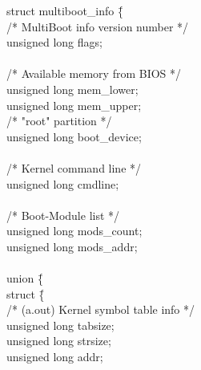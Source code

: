 \documentclass[a4paper]{report}
\begin{document}
\begin{figure}
\begin{tt}
\begin{tabbing}
struct multiboot\_info \= \{                                            \\
/* MultiBoot info version number */                                     \\
\>      unsigned long flags;                                            \\
									\\
/* Available memory from BIOS */                                        \\
\>      unsigned long mem\_lower;                                       \\
\>      unsigned long mem\_upper;                                       \\
/* "root" partition */                                                  \\
\>      unsigned long boot\_device;                                     \\
									\\
/* Kernel command line */                                               \\
\>      unsigned long cmdline;                                          \\
									\\
/* Boot-Module list */                                                  \\
\>      unsigned long mods\_count;                                      \\
\>      unsigned long mods\_addr;                                       \\
									\\
\>      union \= \{                                                     \\
\>      \>      struct \= \{                                            \\
/* (a.out) Kernel symbol table info */                                  \\
\>      \>      \>      unsigned long tabsize;                          \\
\>      \>      \>      unsigned long strsize;                          \\
\>      \>      \>      unsigned long addr;                             \\

\end{tabbing}
\end{tt}
\end{figure}
\end{document}
